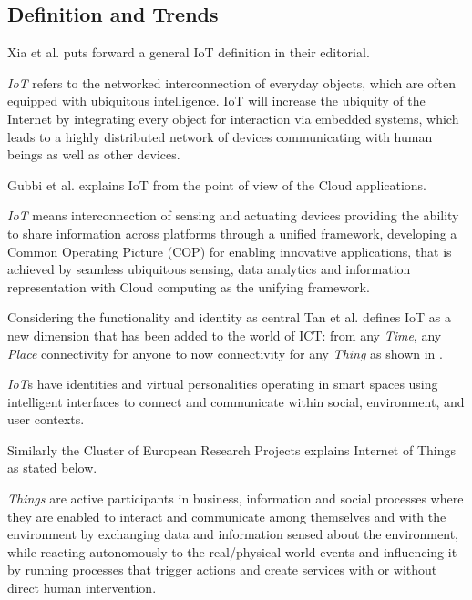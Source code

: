 \subsection{Definition and Trends}
Xia et al. \cite{IOTXIA} puts forward a general \acs{IoT} definition in their editorial.
\begin{definition}
\textit{\acs{IoT}} refers to the networked interconnection of everyday objects, which are often equipped with ubiquitous intelligence. IoT will increase the ubiquity of the Internet by integrating every object for interaction via embedded systems, which leads to a highly distributed network of devices communicating with human beings as well as other devices.
\end{definition}
Gubbi et al. \cite{IOTGUBBI} explains \acs{IoT} from the point of view of the Cloud applications.
\begin{definition}
	\textit{\acs{IoT}} means interconnection of sensing and actuating devices providing the ability to share information across platforms through a unified framework, developing a Common Operating Picture (\acs{COP}) for enabling innovative applications, that is achieved by seamless ubiquitous sensing, data analytics and information representation with Cloud computing as the unifying framework.
\end{definition}
Considering the functionality and identity as central Tan et al. \cite{IOTFUTURE} defines \acs{IoT} as a new dimension that has been added to the world of \acs{ICT}: from any \textit{Time}, any \textit{Place} connectivity for anyone to now connectivity for any \textit{Thing} as shown in .
\begin{definition}
\textit{\acs{IoT}}s have identities and virtual personalities operating in smart spaces using intelligent interfaces to connect and communicate within social, environment, and user contexts.
\end{definition}
Similarly the Cluster of European Research Projects \cite{IOTEUR} explains Internet of Things as stated below.
\begin{definition}
	\textit{Things} are active participants in business, information and social processes where they are enabled to interact and communicate among themselves and with the environment by exchanging data and information sensed about the environment, while reacting autonomously to the real/physical world events and influencing it by running processes that trigger actions and create services with or without direct human intervention.
\end{definition}
